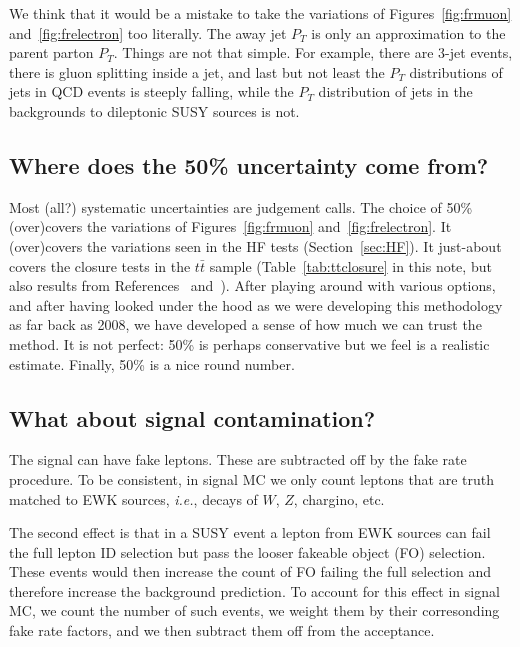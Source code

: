 We think that it would be a mistake to take the variations
of Figures~\ref{fig:frmuon} and~\ref{fig:frelectron} too 
literally.  The away jet $P_T$ is only an approximation
to the parent parton $P_T$.  Things are not that simple.
For example, there are 3-jet events, there is gluon splitting
inside a jet, and last but not least the $P_T$ distributions
of jets in QCD events is steeply falling, while the $P_T$ 
distribution of jets in the backgrounds to dileptonic SUSY 
sources is not.  

\subsection{Where does the 50\% uncertainty come from?}
\label{sec:FRunc}

Most (all?) systematic uncertainties are judgement calls.
The choice of 50\% (over)covers the variations of 
Figures~\ref{fig:frmuon} and~\ref{fig:frelectron}. It 
(over)covers the variations seen in the HF tests 
(Section~\ref{sec:HF}). It just-about covers the 
closure tests in the $t\bar{t}$ sample (Table~\ref{tab:ttclosure}
in this note, but also results from References~\cite{ssnote2011}
and~\cite{frmethod}).
After playing around with various
options, and after having looked under the hood as we were developing
this methodology as far back as 2008, we have developed a sense
of how much we can trust the method.  It is not perfect:
50\% is perhaps conservative but we feel is a  
realistic estimate.  Finally, 50\% is a nice round number.

\subsection{What about signal contamination?}
\label{sec:sigcont}

The signal can have fake leptons.  These are subtracted
off by the fake rate procedure. To be consistent, in signal 
MC we only count leptons that are truth matched to EWK sources, 
{\em i.e.}, decays of $W$, $Z$, chargino, etc.

The second effect is that in a SUSY event a lepton from EWK
sources can fail the full lepton ID selection but pass the 
looser fakeable object (FO) selection.  These events would then 
increase the count of FO failing the full selection and therefore
increase the background prediction.  To account for this effect
in signal MC, we count the number of such events, we weight
them by their corresonding fake rate factors, and we then 
subtract them off from the acceptance.

